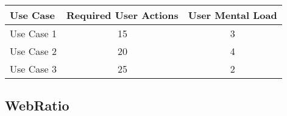 


\begin{tabularx}{\textwidth}{Xcc}
\textbf{Use Case} & \textbf{Required User Actions} & \textbf{User Mental Load}\\
\hline
Use Case 1                          & 15 & 3 \\
Use Case 2                          & 20 & 4 \\
Use Case 3                          & 25 & 2
\end{tabularx}

\subsection*{WebRatio}




